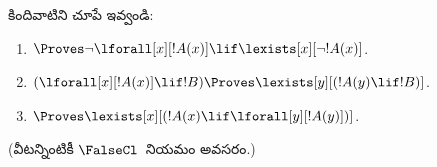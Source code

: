 \documentclass[../../../include/open-logic-section]{subfiles}
\begin{document}
\begin{prob}
కిందివాటిని చూపే  ఇవ్వండి:
\begin{enumerate}
\item $\Proves \lnot\lforall[x][!A(x)] \lif \lexists[x][\lnot!A(x)]$.
\item $(\lforall[x][!A(x)] \lif !B) \Proves \lexists[y][(!A(y) \lif !B)]$.
\item $\Proves \lexists[x][(!A(x) \lif \lforall[y][!A(y)])]$.
\end{enumerate}
(వీటన్నింటికీ $\FalseCl$~నియమం అవసరం.)
\end{prob}
\end{document}
